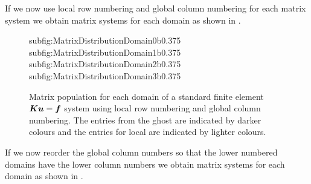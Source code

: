 If we now use local row numbering and global column numbering for each
matrix system we obtain matrix systems for each domain as shown
in .

\begin{figure}[hbtp]
   \centering
   {subfig:MatrixDistributionDomain0b}{0.375}
   \hfil {}
   {subfig:MatrixDistributionDomain1b}{0.375}
   {subfig:MatrixDistributionDomain2b}{0.375}
   \hfil {}
   {subfig:MatrixDistributionDomain3b}{0.375}
   \caption[Matrix population for each domain using local row numbering and global column numbering.]{Matrix population for each domain of a standard finite element $\matr{K}\vectr{u}=\vectr{f}$ system using local row numbering and global column numbering. The entries from the ghost \DoFs are indicated by darker colours and the entries for local \DoFs are indicated by lighter colours.}
   \label{fig:LocalGlobalMatrixDistributionDomain}
\end{figure}

If we now reorder the global column numbers so that the lower numbered domains have the lower column numbers we obtain matrix systems for each domain as shown in .

